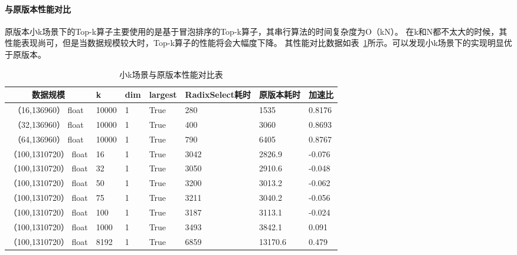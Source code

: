 \paragraph{与原版本性能对比}
原版本小k场景下的Top-k算子主要使用的是基于冒泡排序的Top-k算子，其串行算法的时间复杂度为O（kN）。
在k和N都不太大的时候，其性能表现尚可，但是当数据规模较大时，Top-k算子的性能将会大幅度下降。
其性能对比数据如表~\ref{tab:bench_littlek}所示。可以发现小k场景下的实现明显优于原版本。

\begin{table}[ht]
    \centering
    \caption{小k场景与原版本性能对比表}
    \label{tab:bench_littlek}
    \begin{tabular}{cllllll}
        \toprule
        数据规模       &k  & dim  & largest & RadixSelect耗时    & 原版本耗时 &加速比\\
        \midrule
        （16,136960） float&10000&  1     & True      & 280 & 1535 & 0.8176\\
        （32,136960） float&10000&  1     & True      & 400 & 3060 & 0.8693\\
        （64,136960） float&10000&  1     & True      & 790 & 6405 & 0.8767\\
        
        （100,1310720） float&16&  1     & True      & 3042 & 2826.9 &  -0.076\\
        （100,1310720） float&32&  1     & True      &  3050& 2910.6 &  -0.048\\
        （100,1310720） float&50&  1     & True      & 3200 & 3013.2 &  -0.062 \\
        （100,1310720） float&75&  1     & True      & 3211 & 3040.2 &  -0.056 \\
        （100,1310720） float&100&  1     & True      & 3187& 3113.1 &  -0.024 \\
        （100,1310720） float&1000&  1     & True     & 3493& 3842.1 &   0.091 \\
        （100,1310720） float&8192&  1     & True      & 6859& 13170.6 & 0.479 \\
      
        \bottomrule
    \end{tabular}
    \end{table}

